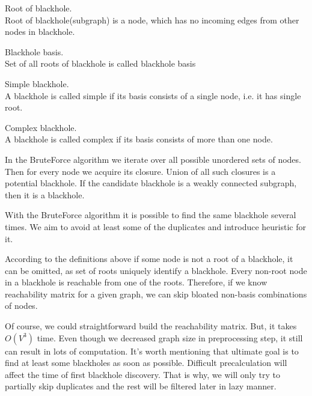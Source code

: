 \documentclass{svproc}
\begin{document}
\begin{definition}{Root of blackhole.\\}
Root of blackhole(subgraph) is a node, which has no incoming edges from other nodes in blackhole.
\end{definition}

\begin{definition}{Blackhole basis. \\}
Set of all roots of blackhole is called blackhole basis
\end{definition}

\begin{definition}{Simple blackhole. \\}
A blackhole is called simple if its basis consists of a single node, i.e. it has single root.
\end{definition}

\begin{definition}{Complex blackhole. \\}
A blackhole is called complex if its basis consists of more than one node.
\end{definition}

In the BruteForce algorithm we iterate over all possible unordered sets of nodes. 
Then for every node we acquire its closure. Union of all such closures is a potential blackhole.
If the candidate blackhole is a weakly connected subgraph, then it is a blackhole.

With the BruteForce algorithm it is possible to find the same blackhole several times.
We aim to avoid at least some of the duplicates and introduce heuristic for it.

According to the definitions above if some node is not a root of a blackhole, it can be omitted, as set of roots uniquely identify a blackhole.
Every non-root node in a blackhole is reachable from one of the roots. Therefore, if we know reachability matrix for a given graph, we can skip bloated non-basis combinations of nodes.

Of course, we could straightforward build the reachability matrix. But, it takes $O(V^3)$ time. Even though we decreased graph size
in preprocessing step, it still can result in lots of computation. It's worth mentioning that ultimate goal is to find at least some blackholes as soon as possible. 
Difficult precalculation will affect the time of first blackhole discovery. That is why, we will only try to partially skip duplicates and the rest will
be filtered later in lazy manner.
\end{document}
